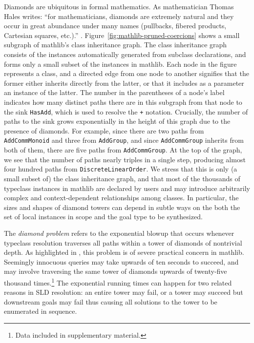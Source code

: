 \documentclass[runningheads]{llncs}
\begin{document}
Diamonds are ubiquitous in formal mathematics.
As mathematician Thomas Hales writes: ``for mathematicians, diamonds are extremely natural and they occur in great abundance under many names (pullbacks, fibered products, Cartesian squares, etc.).'' \cite{halesreview}.
Figure~\ref{fig:mathlib-pruned-coercions} shows a small subgraph of \textsf{mathlib}'s class inheritance graph.
The class inheritance graph consists of the instances automatically generated from subclass declarations,
and forms only a small subset of the instances in \textsf{mathlib}.
Each node in the figure represents a class, and a directed edge from one node to another signifies that the former either inherits directly from the latter,
or that it includes as a parameter an instance of the latter. The number in the parentheses of a node's label indicates how many
distinct paths there are in this subgraph from that node to the sink \lstinline{HasAdd}, which is used to resolve the \lstinline{+} notation.
Crucially, the number of paths to the sink grows exponentially in the height of this graph due to the presence of diamonds.
For example, since there are two paths from \lstinline{AddCommMonoid} and three from \lstinline{AddGroup},
and since \lstinline{AddCommGroup} inherits from both of them, there are five paths from \lstinline{AddCommGroup}.
At the top of the graph, we see that the number of paths nearly triples in a single step, producing almost four hundred paths from \lstinline{DiscreteLinearOrder}.
We stress that this is only (a small subset of) the class inheritance graph, and that most
of the thousands of typeclass instances in \textsf{mathlib} are declared by users
and may introduce arbitrarily complex and context-dependent relationships among classes.
In particular, the sizes and shapes of diamond towers can depend in subtle ways on the both
the set of local instances in scope and the goal type to be synthesized.

The \emph{diamond problem} refers to the exponential blowup that occurs whenever typeclass resolution traverses all paths within a tower of diamonds
of nontrivial depth. As highlighted in \cite{2019arXiv191009336M}, this problem is of severe practical concern in \textsf{mathlib}.
Seemingly innocuous queries may take upwards of ten seconds to succeed,
and may involve traversing the same tower of diamonds upwards of twenty-five thousand times.\footnote{Data included in supplementary material.}
The exponential running times can happen for two related reasons in SLD resolution:
an entire tower may fail, or a tower may succeed
but downstream goals may fail thus causing all solutions to the tower to be enumerated in sequence.
\end{document}
